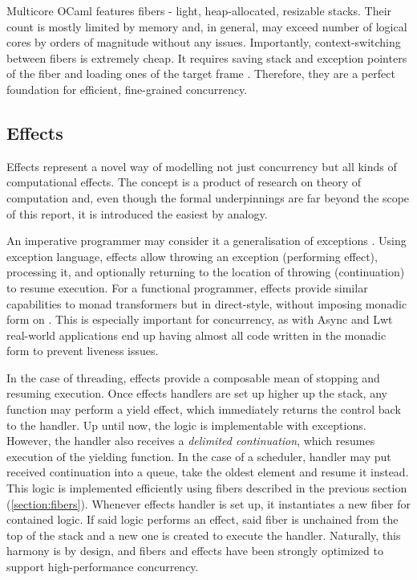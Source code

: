 \documentclass[12pt,a4paper,twoside]{report}
\begin{document}
Multicore OCaml features fibers - light, heap-allocated, resizable stacks. Their count is mostly limited by memory and, in general, may exceed number of logical cores by orders of magnitude without any issues. Importantly, context-switching between fibers is extremely cheap. It requires saving stack and exception pointers of the fiber and loading ones of the target frame \cite{Sivaramakrishnan2021}. Therefore, they are a perfect foundation for efficient, fine-grained concurrency. 

\subsection{Effects}
\label{section:effects}
Effects represent a novel way of modelling not just concurrency but all kinds of computational effects. The concept is a product of research on theory of computation \cite{Pretnar2015} and, even though the formal underpinnings are far beyond the scope of this report, it is introduced the easiest by analogy. 

An imperative programmer may consider it a generalisation of exceptions \cite{Brachthuser2020}. Using exception language, effects allow throwing an exception (performing effect), processing it, and optionally returning to the location of throwing (continuation) to resume execution. For a functional programmer, effects provide similar capabilities to monad transformers but in direct-style, without imposing monadic form on \cite{Sivaramakrishnan2021}. This is especially important for concurrency, as with Async and Lwt real-world applications end up having almost all code written in the monadic form to prevent liveness issues. 

In the case of threading, effects provide a composable mean of stopping and resuming execution. Once effects handlers are set up higher up the stack, any function may perform a yield effect, which immediately returns the control back to the handler. Up until now, the logic is implementable with exceptions. However, the handler also receives a \textit{delimited continuation}, which resumes execution of the yielding function. In the case of a scheduler, handler may put received continuation into a queue, take the oldest element and resume it instead. This logic is implemented efficiently using fibers described in the previous section (\ref{section:fibers}). Whenever effects handler is set up, it instantiates a new fiber for contained logic. If said logic performs an effect, said fiber is unchained from the top of the stack and a new one is created to execute the handler. Naturally, this harmony is by design, and fibers and effects have been strongly optimized to support high-performance concurrency. 
\end{document}
